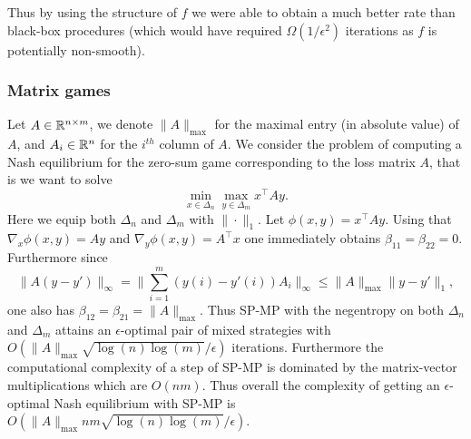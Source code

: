 Thus by using the structure of $f$ we were able to obtain a much better rate than black-box procedures (which would have required $\Omega(1/\epsilon^2)$ iterations as $f$ is potentially non-smooth).

\subsubsection{Matrix games} \label{sec:spex2}
Let $A \in \mathbb{R}^{n \times m}$, we denote $\|A\|_{\mathrm{max}}$ for the maximal entry (in absolute value) of $A$, and $A_i \in \mathbb{R}^n$ for the $i^{th}$ column of $A$. We consider the problem of computing a Nash equilibrium for the zero-sum game corresponding to the loss matrix $A$, that is we want to solve
$$\min_{x \in \Delta_n} \max_{y \in \Delta_m} x^{\top} A y .$$
Here we equip both $\Delta_n$ and $\Delta_m$ with $\|\cdot\|_1$. Let $\phi(x,y) = x^{\top} A y$. Using that $\nabla_x \phi(x,y) = Ay$ and $\nabla_y \phi(x,y) = A^{\top} x$ one immediately obtains $\beta_{11} = \beta_{22} = 0$. Furthermore since
$$\|A(y - y') \|_{\infty} = \|\sum_{i=1}^m (y(i) - y'(i)) A_i \|_{\infty} \leq \|A\|_{\mathrm{max}} \|y - y'\|_1 ,$$
one also has $\beta_{12} = \beta_{21} = \|A\|_{\mathrm{max}}$. Thus SP-MP with the negentropy on both $\Delta_n$ and $\Delta_m$ attains an $\epsilon$-optimal pair of mixed strategies with $O\left(\|A\|_{\mathrm{max}} \sqrt{\log(n) \log(m)} / \epsilon \right)$ iterations. Furthermore the computational complexity of a step of SP-MP is dominated by the matrix-vector multiplications which are $O(n m)$. Thus overall the complexity of getting an $\epsilon$-optimal Nash equilibrium with SP-MP is $O\left(\|A\|_{\mathrm{max}} n m \sqrt{\log(n) \log(m)} / \epsilon  \right)$.

